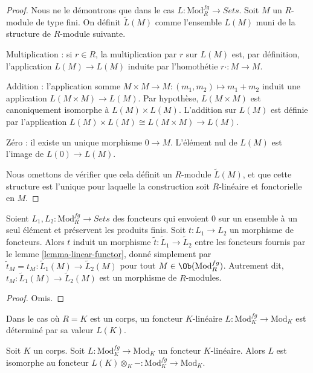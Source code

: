 \begin{proof}
Nous ne le démontrons que dans le cas
$L: \text{Mod}^{fg}_R \to \textit{Sets}$. Soit $M$ un $R$-module de type
fini. On définit $\widetilde{L}(M)$ comme l'ensemble $L(M)$ muni de la
structure de $R$-module suivante.

\medskip\noindent
Multiplication : si $r \in R$, la multiplication par $r$ sur $L(M)$ est, par
définition, l'application $L(M) \to L(M)$ induite par l'homothétie
$r \cdot : M \to M$.

\medskip\noindent
Addition : l'application somme $M \times M \to M: (m_1, m_2) \mapsto m_1 + m_2$
induit une application
$L(M \times M) \to L(M)$. Par hypothèse, $L(M \times M)$ est canoniquement
isomorphe à $L(M) \times L(M)$. L'addition sur $L(M)$ est définie par
l'application $L(M) \times L(M) \cong L(M \times M) \to L(M)$.

\medskip\noindent
Zéro : il existe un unique morphisme $0 \to M$. L'élément nul de $L(M)$
est l'image de $L(0) \to L(M)$.

\medskip\noindent
Nous omettons de vérifier que cela définit un $R$-module
$\widetilde{L}(M)$, et que cette structure est l'unique pour laquelle la
construction soit $R$-linéaire et fonctorielle en $M$.
\end{proof}

\begin{lemma}
\label{lemma-morphism-linear-functors}
Soient $L_1, L_2: \text{Mod}^{fg}_R \to \textit{Sets}$ des foncteurs qui
envoient $0$ sur un ensemble à un seul élément et préservent les produits finis. Soit
$t : L_1 \to L_2$ un morphisme de foncteurs. Alors $t$ induit un morphisme
$\widetilde{t} : \widetilde{L}_1 \to \widetilde{L}_2$ entre les foncteurs
fournis par le lemme \ref{lemma-linear-functor}, donné simplement par
$\widetilde{t}_M = t_M: \widetilde{L}_1(M) \to \widetilde{L}_2(M)$ pour tout
$M \in \Ob(\text{Mod}^{fg}_R)$. Autrement dit,
$t_M: \widetilde{L}_1(M) \to \widetilde{L}_2(M)$ est un morphisme de
$R$-modules.
\end{lemma}

\begin{proof}
Omis.
\end{proof}

\noindent
Dans le cas où $R = K$ est un corps, un foncteur $K$-linéaire
$L : \text{Mod}^{fg}_K \to \text{Mod}_K$ est déterminé par sa valeur $L(K)$.

\begin{lemma}
\label{lemma-linear-functor-over-field}
Soit $K$ un corps. Soit $L: \text{Mod}^{fg}_K \to
\text{Mod}_K$ un foncteur
$K$-linéaire. Alors $L$ est isomorphe au foncteur
$L(K) \otimes_K - : \text{Mod}^{fg}_K \to
\text{Mod}_K$.
\end{lemma}

